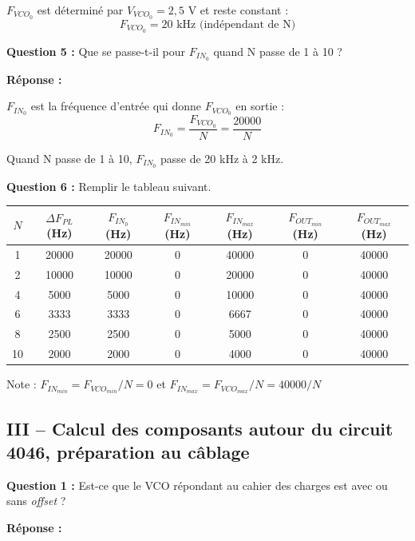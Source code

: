 \documentclass[a4paper,11pt]{article}
\begin{document}
$F_{VCO_0}$ est déterminé par $V_{VCO_0} = 2{,}5$ V et reste constant :
\[
\boxed{F_{VCO_0} = 20 \text{ kHz}} \text{ (indépendant de N)}
\]

\vspace{0.5cm}
\textbf{Question 5 :} Que se passe-t-il pour $F_{IN_0}$ quand N passe de 1 à 10 ?

\vspace{0.3cm}
\textbf{Réponse :}

$F_{IN_0}$ est la fréquence d'entrée qui donne $F_{VCO_0}$ en sortie :
\[
F_{IN_0} = \frac{F_{VCO_0}}{N} = \frac{20000}{N}
\]

Quand N passe de 1 à 10, $F_{IN_0}$ passe de 20 kHz à 2 kHz.

\vspace{0.5cm}
\textbf{Question 6 :} Remplir le tableau suivant.

\vspace{0.3cm}
\begin{center}
\begin{tabular}{|c|c|c|c|c|c|c|}
\hline
$N$ & $\Delta F_{PL}$ (Hz) & $F_{IN_0}$ (Hz) & $F_{IN_{min}}$ (Hz) & $F_{IN_{max}}$ (Hz) & $F_{OUT_{min}}$ (Hz) & $F_{OUT_{max}}$ (Hz) \\
\hline
1 & 20000 & 20000 & 0 & 40000 & 0 & 40000 \\
\hline
2 & 10000 & 10000 & 0 & 20000 & 0 & 40000 \\
\hline
4 & 5000 & 5000 & 0 & 10000 & 0 & 40000 \\
\hline
6 & 3333 & 3333 & 0 & 6667 & 0 & 40000 \\
\hline
8 & 2500 & 2500 & 0 & 5000 & 0 & 40000 \\
\hline
10 & 2000 & 2000 & 0 & 4000 & 0 & 40000 \\
\hline
\end{tabular}
\end{center}

Note : $F_{IN_{min}} = F_{VCO_{min}}/N = 0$ et $F_{IN_{max}} = F_{VCO_{max}}/N = 40000/N$

\subsection*{III -- Calcul des composants autour du circuit 4046, préparation au câblage}

\textbf{Question 1 :} Est-ce que le VCO répondant au cahier des charges est avec ou sans \textit{offset} ?

\vspace{0.3cm}
\textbf{Réponse :}
\end{document}
